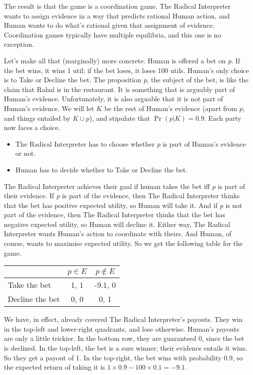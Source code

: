 \documentclass[11pt,]{book}
\providecommand{\tightlist}{%
  \setlength{\itemsep}{0pt}\setlength{\parskip}{0pt}}
\def\toprule{}
\def\bottomrule{}
\def\midrule{}
\begin{document}
The result is that the game is a coordination game. The Radical Interpreter wants to assign evidence in a way that predicts rational Human action, and Human wants to do what's rational given that assignment of evidence. Coordination games typically have multiple equilibria, and this one is no exception.

Let's make all that (marginally) more concrete. Human is offered a bet on \emph{p}. If the bet wins, it wins 1 util; if the bet loses, it loses 100 utils. Human's only choice is to Take or Decline the bet. The proposition \emph{p}, the subject of the bet, is like the claim that Rahul is in the restaurant. It is something that is arguably part of Human's evidence. Unfortunately, it is also arguable that it is not part of Human's evidence. We will let \(K\) be the rest of Human's evidence (apart from \(p\), and things entailed by \(K \cup p\)), and stipulate that \(\Pr(p | K) = 0.9\). Each party now faces a choice.

\begin{itemize}
\tightlist
\item
  The Radical Interpreter has to choose whether \emph{p} is part of Human's evidence or not.
\item
  Human has to decide whether to Take or Decline the bet.
\end{itemize}

The Radical Interpreter achieves their goal if human takes the bet iff \emph{p} is part of their evidence. If \emph{p} is part of the evidence, then The Radical Interpreter thinks that the bet has positive expected utility, so Human will take it. And if \emph{p} is not part of the evidence, then The Radical Interpreter thinks that the bet has negative expected utility, so Human will decline it. Either way, The Radical Interpreter wants Human's action to coordinate with theirs. And Human, of course, wants to maximise expected utility. So we get the following table for the game.

\begin{longtable}[]{@{}lcc@{}}
\toprule
& \(p \in E\) & \(p \notin E\)\tabularnewline
\midrule
\endhead
Take the bet & 1, 1 & -9.1, 0\tabularnewline
Decline the bet & 0, 0 & 0, 1\tabularnewline
\bottomrule
\end{longtable}

We have, in effect, already covered The Radical Interpreter's payouts. They win in the top-left and lower-right quadrants, and lose otherwise. Human's payouts are only a little trickier. In the bottom row, they are guaranteed 0, since the bet is declined. In the top-left, the bet is a sure winner; their evidence entails it wins. So they get a payout of 1. In the top-right, the bet wins with probability 0.9, so the expected return of taking it is \(1 \times 0.9 - 100 \times 0.1 = -9.1\).
\end{document}
